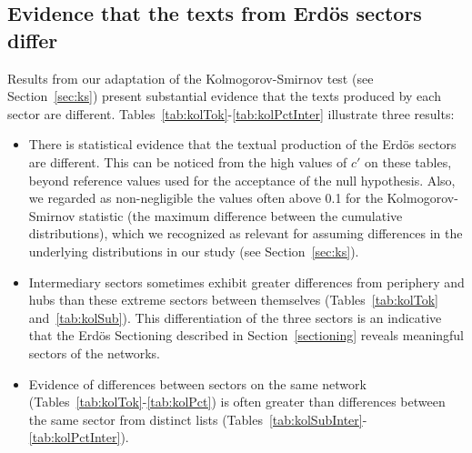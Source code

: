 \subsection{Evidence that the texts from Erd\"os sectors differ}\label{subsec:di}
Results from our adaptation of the Kolmogorov-Smirnov test (see Section~\ref{sec:ks})
present substantial evidence
that the texts produced by each sector are different.
Tables~\ref{tab:kolTok}-\ref{tab:kolPctInter}
illustrate three results:
\begin{itemize}
    \item There is statistical evidence that the textual production of the Erd\"os sectors are different.
	    This can be noticed from the high values of $c'$ on these tables,
	    beyond reference values used for the acceptance of the 
	    null hypothesis.
		Also, we regarded as non-negligible 
		the values often above 0.1 for the Kolmogorov-Smirnov statistic (the maximum difference between the cumulative distributions),
		which we recognized as relevant for assuming differences in the underlying distributions in our study (see Section~\ref{sec:ks}).
    \item Intermediary sectors sometimes exhibit greater differences 
from periphery and hubs than these extreme sectors between themselves 
(Tables~\ref{tab:kolTok} and~\ref{tab:kolSub}).
This differentiation of the three sectors is an
indicative that the Erd\"os Sectioning
described in Section~\ref{sectioning} reveals meaningful
sectors of the networks.
    \item Evidence of differences between sectors on the same network 
	    (Tables~\ref{tab:kolTok}-\ref{tab:kolPct}) is often greater than differences between the same sector from distinct lists (Tables~\ref{tab:kolSubInter}-\ref{tab:kolPctInter}).
\end{itemize}










\FloatBarrier
